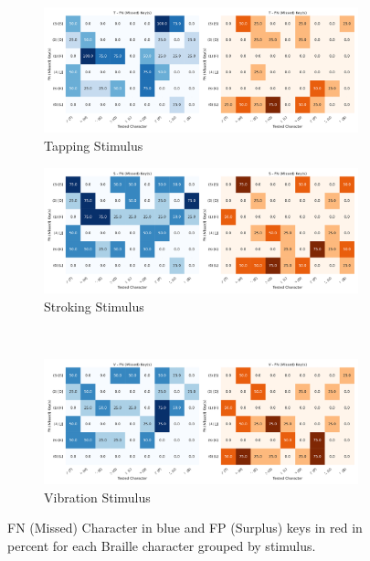 \begin{figure}[h!]
    \centering
    \begin{subfigure}[b]{0.45\textwidth}
        \centering
        \includegraphics[width=\textwidth]{src/pictures/Study1Data_Experiment/heatmap_T_correlations_by_conditions_percentages.pdf}
        \caption{Tapping Stimulus}
    \end{subfigure}
    \begin{subfigure}[b]{0.45\textwidth}
        \centering
        \includegraphics[width=\textwidth]{src/pictures/Study1Data_Experiment/heatmap_S_correlations_by_conditions_percentages.pdf}
        \caption{Stroking Stimulus}
    \end{subfigure}\\
    \begin{subfigure}[b]{0.45\textwidth}
        \centering
        \includegraphics[width=\textwidth]{src/pictures/Study1Data_Experiment/heatmap_V_correlations_by_conditions_percentages.pdf}
        \caption{Vibration Stimulus}
    \end{subfigure}
    \caption{FN (Missed) Character in blue and FP (Surplus) keys in red in percent for each Braille character grouped by stimulus.}
    \label{fig:missed_surplus_percentages_study1}
\end{figure}

